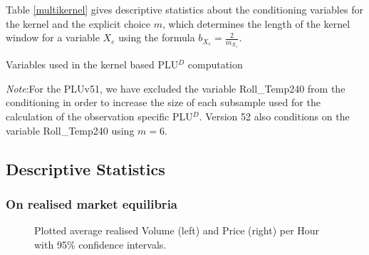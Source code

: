 \begin{subappendices}
Table \ref{multikernel} gives descriptive statistics about the conditioning variables for the kernel and the explicit choice $m$, which determines the length of the kernel window for a variable $X_e$ using the formula $b_{X_e} = \frac{2}{m_{X_e}}$.\\


\begin{table}[!ht]
\vspace{-0cm}

\caption{\label{multikernel} Variables used in the kernel based PLU$^D$ computation}
\emph{Note}:For the PLUv51, we have excluded the variable Roll\_Temp240 from the conditioning in order to increase the size of each subsample used for the calculation of the observation specific PLU$^D$. Version 52 also conditions on the variable Roll\_Temp240 using $m=6$.
\end{table}


\subsection{Descriptive Statistics}
\label{statdes}
\subsubsection{On realised market equilibria}
\begin{figure}[H]
\begin{center} 
\end{center}
\caption{\small Plotted average realised Volume (left) and Price (right) per Hour with 95\% confidence intervals.}
\label{EquilVolPriperHour}
\end{figure}



\end{subappendices}
